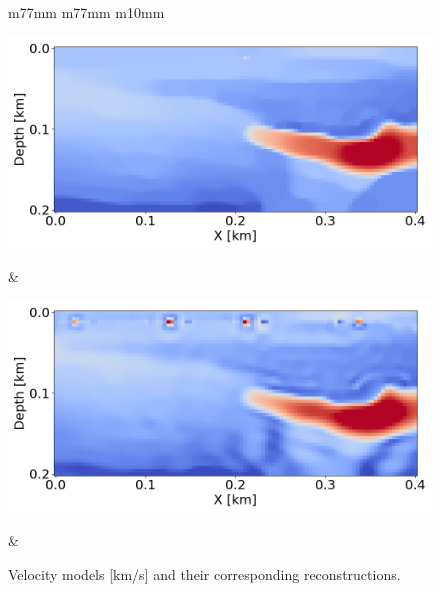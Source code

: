 \begin{figure}[htbp]
\begin{tabular}{m{77mm} m{77mm} m{10mm}}
        \begin{minipage}[b]{\linewidth}
            \centering
            \vspace{-1mm}
            \includegraphics[width=\linewidth]{public/alpha_350}
            \vspace{-8mm}
            \caption*{Proposed Method, $\alpha = 350$}
            \vspace{1mm}
        \end{minipage} &
        \begin{minipage}[b]{\linewidth}
            \centering
            \vspace{-1mm}
            \includegraphics[width=\linewidth]{public/alpha_550}
            \vspace{-8mm}
            \caption*{Proposed Method, $\alpha = 550$}
            \vspace{1mm}
        \end{minipage} &
    \end{tabular}
    \caption{Velocity models [km/s] and their corresponding reconstructions.}
    \label{fig:velocity-models}
\end{figure}
